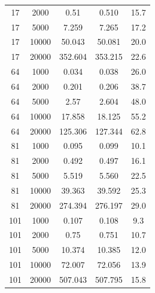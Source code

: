 \documentclass{deliverablereport}
\begin{document}
\begin{small}
\begin{center}
\begin{longtable}{|c|c|c|c|c|}
17&2000&0.51&0.510&15.7\\
17&5000&7.259&7.265&17.2\\
17&10000&50.043&50.081&20.0\\
17&20000&352.604&353.215&22.6\\
64&1000&0.034&0.038&26.0\\
64&2000&0.201&0.206&38.7\\
64&5000&2.57&2.604&48.0\\
64&10000&17.858&18.125&55.2\\
64&20000&125.306&127.344&62.8\\
81&1000&0.095&0.099&10.1\\
81&2000&0.492&0.497&16.1\\
81&5000&5.519&5.560&22.5\\
81&10000&39.363&39.592&25.3\\
81&20000&274.394&276.197&29.0\\
101&1000&0.107&0.108&9.3\\
101&2000&0.75&0.751&10.7\\
101&5000&10.374&10.385&12.0\\
101&10000&72.007&72.056&13.9\\
101&20000&507.043&507.795&15.8\\
  \end{longtable}
\end{center}
  

\end{small}
\end{document}
